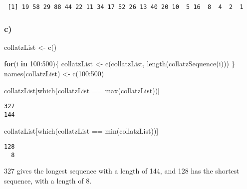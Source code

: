 \documentclass[
  letterpaper,
  DIV=11,
  numbers=noendperiod]{scrartcl}
\newenvironment{Shaded}{\begin{snugshade}}{\end{snugshade}}
\newcommand{\ControlFlowTok}[1]{\textcolor[rgb]{0.00,0.23,0.31}{\textbf{#1}}}
\newcommand{\DecValTok}[1]{\textcolor[rgb]{0.68,0.00,0.00}{#1}}
\newcommand{\FunctionTok}[1]{\textcolor[rgb]{0.28,0.35,0.67}{#1}}
\newcommand{\NormalTok}[1]{\textcolor[rgb]{0.00,0.23,0.31}{#1}}
\newcommand{\OtherTok}[1]{\textcolor[rgb]{0.00,0.23,0.31}{#1}}
\newcommand{\SpecialCharTok}[1]{\textcolor[rgb]{0.37,0.37,0.37}{#1}}
\begin{document}
\begin{verbatim}
 [1] 19 58 29 88 44 22 11 34 17 52 26 13 40 20 10  5 16  8  4  2  1
\end{verbatim}

\subsubsection{c)}\label{c-5}

\begin{Shaded}
\begin{Highlighting}[]
\NormalTok{collatzList }\OtherTok{\textless{}{-}} \FunctionTok{c}\NormalTok{()}

\ControlFlowTok{for}\NormalTok{(i }\ControlFlowTok{in} \DecValTok{100}\SpecialCharTok{:}\DecValTok{500}\NormalTok{)\{}
\NormalTok{  collatzList }\OtherTok{\textless{}{-}} \FunctionTok{c}\NormalTok{(collatzList, }\FunctionTok{length}\NormalTok{(}\FunctionTok{collatzSequence}\NormalTok{(i)))}
\NormalTok{\}}
\FunctionTok{names}\NormalTok{(collatzList) }\OtherTok{\textless{}{-}} \FunctionTok{c}\NormalTok{(}\DecValTok{100}\SpecialCharTok{:}\DecValTok{500}\NormalTok{)}

\NormalTok{collatzList[}\FunctionTok{which}\NormalTok{(collatzList }\SpecialCharTok{==} \FunctionTok{max}\NormalTok{(collatzList))]}
\end{Highlighting}
\end{Shaded}

\begin{verbatim}
327 
144 
\end{verbatim}

\begin{Shaded}
\begin{Highlighting}[]
\NormalTok{collatzList[}\FunctionTok{which}\NormalTok{(collatzList }\SpecialCharTok{==} \FunctionTok{min}\NormalTok{(collatzList))]}
\end{Highlighting}
\end{Shaded}

\begin{verbatim}
128 
  8 
\end{verbatim}

327 gives the longest sequence with a length of 144, and 128 has the
shortest sequence, with a length of 8.
\end{document}

